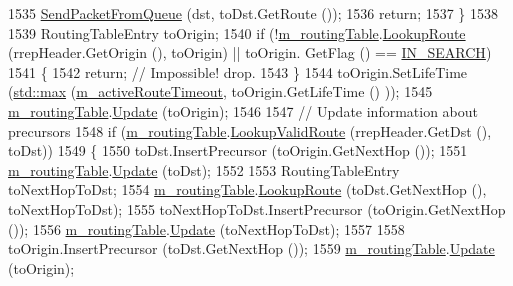 \begin{DoxyCode}
1535       \hyperlink{classns3_1_1aodv_1_1RoutingProtocol_a7cd2a3baf7b377fbbf85de4275164f2b}{SendPacketFromQueue} (dst, toDst.GetRoute ());
1536       \textcolor{keywordflow}{return};
1537     \}
1538 
1539   RoutingTableEntry toOrigin;
1540   \textcolor{keywordflow}{if} (!\hyperlink{classns3_1_1aodv_1_1RoutingProtocol_a4e1003a34c8adc96db71096d88c98ae0}{m\_routingTable}.\hyperlink{classns3_1_1aodv_1_1RoutingTable_a90cbc8a2c65cd68ccdaf768fcbb5d723}{LookupRoute} (rrepHeader.GetOrigin (), toOrigin) || toOrigin.
      GetFlag () == \hyperlink{group__aodv_gga44216921a9c725a5ab8bc19059052a26aba44cda5a5df371b6567f70d7d8311fa}{IN\_SEARCH})
1541     \{
1542       \textcolor{keywordflow}{return}; \textcolor{comment}{// Impossible! drop.}
1543     \}
1544   toOrigin.SetLifeTime (\hyperlink{80211b_8c_affe776513b24d84b39af8ab0930fef7f}{std::max} (\hyperlink{classns3_1_1aodv_1_1RoutingProtocol_a37ec921ef1c48e4d8e7072fe989613d2}{m\_activeRouteTimeout}, toOrigin.GetLifeTime ()
      ));
1545   \hyperlink{classns3_1_1aodv_1_1RoutingProtocol_a4e1003a34c8adc96db71096d88c98ae0}{m\_routingTable}.\hyperlink{classns3_1_1aodv_1_1RoutingTable_a39fb5335110164f4c1b97682a3812dc1}{Update} (toOrigin);
1546 
1547   \textcolor{comment}{// Update information about precursors}
1548   \textcolor{keywordflow}{if} (\hyperlink{classns3_1_1aodv_1_1RoutingProtocol_a4e1003a34c8adc96db71096d88c98ae0}{m\_routingTable}.\hyperlink{classns3_1_1aodv_1_1RoutingTable_a2ca8c3757223d681d4cc39e2028fa7ad}{LookupValidRoute} (rrepHeader.GetDst (), toDst))
1549     \{
1550       toDst.InsertPrecursor (toOrigin.GetNextHop ());
1551       \hyperlink{classns3_1_1aodv_1_1RoutingProtocol_a4e1003a34c8adc96db71096d88c98ae0}{m\_routingTable}.\hyperlink{classns3_1_1aodv_1_1RoutingTable_a39fb5335110164f4c1b97682a3812dc1}{Update} (toDst);
1552 
1553       RoutingTableEntry toNextHopToDst;
1554       \hyperlink{classns3_1_1aodv_1_1RoutingProtocol_a4e1003a34c8adc96db71096d88c98ae0}{m\_routingTable}.\hyperlink{classns3_1_1aodv_1_1RoutingTable_a90cbc8a2c65cd68ccdaf768fcbb5d723}{LookupRoute} (toDst.GetNextHop (), toNextHopToDst);
1555       toNextHopToDst.InsertPrecursor (toOrigin.GetNextHop ());
1556       \hyperlink{classns3_1_1aodv_1_1RoutingProtocol_a4e1003a34c8adc96db71096d88c98ae0}{m\_routingTable}.\hyperlink{classns3_1_1aodv_1_1RoutingTable_a39fb5335110164f4c1b97682a3812dc1}{Update} (toNextHopToDst);
1557 
1558       toOrigin.InsertPrecursor (toDst.GetNextHop ());
1559       \hyperlink{classns3_1_1aodv_1_1RoutingProtocol_a4e1003a34c8adc96db71096d88c98ae0}{m\_routingTable}.\hyperlink{classns3_1_1aodv_1_1RoutingTable_a39fb5335110164f4c1b97682a3812dc1}{Update} (toOrigin);

\end{DoxyCode}
